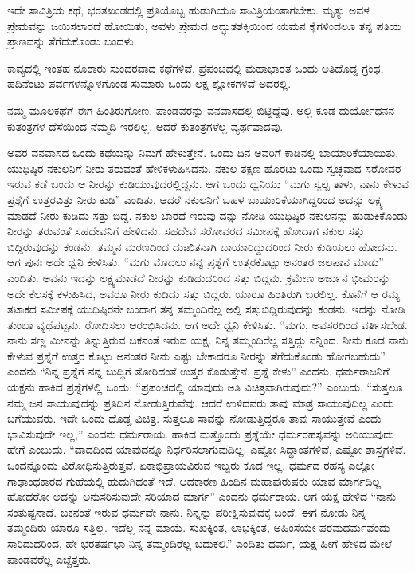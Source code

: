 ಇದೇ ಸಾವಿತ್ರಿಯ ಕಥೆ, ಭರತಖಂಡದಲ್ಲಿ ಪ್ರತಿಯೊಬ್ಬ ಹುಡುಗಿಯೂ ಸಾವಿತ್ರಿಯಂತಾಗಬೇಕು. ಮೃತ್ಯು ಅವಳ ಪ್ರೇಮವನ್ನು ಜಯಿಸಲಾರದೆ ಹೋಯಿತು, ಅವಳು ಪ್ರೇಮದ ಅದ್ಭುತಶಕ್ತಿಯಿಂದ ಯಮನ ಕೈಗಳಿಂದಲೂ ತನ್ನ ಪತಿಯ ಪ್ರಾಣವನ್ನು ತೆಗೆದುಕೊಂಡು ಬಂದಳು.

ಕಾವ್ಯದಲ್ಲಿ ಇಂತಹ ನೂರಾರು ಸುಂದರವಾದ ಕಥೆಗಳಿವೆ. ಪ್ರಪಂಚದಲ್ಲಿ ಮಹಾಭಾರತ ಒಂದು ಅತಿದೊಡ್ಡ ಗ್ರಂಥ, ಹದಿನೆಂಟು ಪರ್ವಗಳನ್ನೊಳಗೊಂಡ ಸುಮಾರು ಒಂದು ಲಕ್ಷ ಶ್ಲೋಕಗಳಿವೆ ಅದರಲ್ಲಿ.

ನಮ್ಮ ಮೂಲಕಥೆಗೆ ಈಗ ಹಿಂತಿರುಗೋಣ. ಪಾಂಡವರನ್ನು ವನವಾಸದಲ್ಲಿ ಬಿಟ್ಟಿದ್ದೆವು. ಅಲ್ಲಿ ಕೂಡ ದುರ್ಯೋಧನನ ಕುತಂತ್ರಗಳ ದೆಸೆಯಿಂದ ನೆಮ್ಮದಿ ಇರಲಿಲ್ಲ. ಆದರೆ ಕುತಂತ್ರಗಳೆಲ್ಲ ವ್ಯರ್ಥವಾದವು.

ಅವರ ವನವಾಸದ ಒಂದು ಕಥೆಯನ್ನು ನಿಮಗೆ ಹೇಳುತ್ತೇನೆ. ಒಂದು ದಿನ ಅವರಿಗೆ ಕಾಡಿನಲ್ಲಿ ಬಾಯಾರಿಕೆಯಾಯಿತು. ಯುಧಿಷ್ಠಿರ ನಕುಲನಿಗೆ ನೀರು ತರುವಂತೆ ಹೇಳಿಕಳುಹಿಸಿದನು. ನಕುಲ ತಕ್ಷಣ ಹೊರಟು ಒಂದು ಸ್ವಚ್ಛವಾದ ಸರೋವರ ಇರುವ ಕಡೆ ಬಂದು ಆ ನೀರನ್ನು ಕುಡಿಯುವುದರಲ್ಲಿದ್ದನು. ಆಗ ಒಂದು ಧ್ವನಿಯು “ಮಗು ಸ್ವಲ್ಪ ತಾಳು, ನಾನು ಕೇಳುವ ಪ್ರಶ್ನೆಗೆ ಉತ್ತರವಿತ್ತು ನೀರು ಕುಡಿ” ಎಂದಿತು. ಆದರೆ ನಕುಲನಿಗೆ ಬಹಳ ಬಾಯಾರಿಕೆಯಾಗಿದ್ದರಿಂದ ಅದನ್ನು ಲಕ್ಷ್ಯ ಮಾಡದೆ ನೀರು ಕುಡಿದು ಸತ್ತು ಬಿದ್ದ. ನಕುಲ ಬಾರದೆ ಇರುವು ದನ್ನು ನೋಡಿ ಯುಧಿಷ್ಠಿರ ನಕುಲನನ್ನು ಹುಡುಕಿಕೊಂಡು ನೀರನ್ನು ತರುವಂತೆ ಸಹದೇವನಿಗೆ ಹೇಳಿದನು. ಸಹದೇವ ಸರೋವರದ ಸಮೀಪಕ್ಕೆ ಹೋದಾಗ ನಕುಲ ಸತ್ತು ಬಿದ್ದಿರುವುದನ್ನು ಕಂಡನು. ತಮ್ಮನ ಮರಣದಿಂದ ದುಃಖಿತನಾಗಿ ಬಾಯಾರಿದ್ದುದರಿಂದ ನೀರು ಕುಡಿಯಲು ಹೋದನು. ಆಗ ಪುನಃ ಅದೇ ಧ್ವನಿ ಕೇಳಿಸಿತು. “ಮಗು ಮೊದಲು ನನ್ನ ಪ್ರಶ್ನೆಗೆ ಉತ್ತರಕೊಟ್ಟು ಅನಂತರ ಜಲಪಾನ ಮಾಡು” ಎಂದಿತು. ಅವನು ಇದನ್ನು ಲಕ್ಷ್ಯಮಾಡದೆ ನೀರನ್ನು ಕುಡಿದುದರಿಂದ ಸತ್ತು ಬಿದ್ದನು. ಕ್ರಮೇಣ ಅರ್ಜುನ ಭೀಮರನ್ನು ಅದೇ ಕೆಲಸಕ್ಕೆ ಕಳುಹಿಸಿದ, ಅವರೂ ನೀರು ಕುಡಿದು ಸತ್ತು ಬಿದ್ದರು. ಯಾರೂ ಹಿಂತಿರುಗಿ ಬರಲಿಲ್ಲ. ಕೊನೆಗೆ ಆ ರಮ್ಯ ತಟಾಕದ ಸಮೀಪಕ್ಕೆ ಯುಧಿಷ್ಠಿರನೇ ಬಂದಾಗ ತನ್ನ ತಮ್ಮಂದಿರೆಲ್ಲ ಅಲ್ಲಿ ಸತ್ತುಬಿದ್ದಿರುವುದನ್ನು ಕಂಡನು. ಇದನ್ನು ನೋಡಿ ತುಂಬಾ ವ್ಯಥೆಪಟ್ಟನು. ರೋದಿಸಲು ಆರಂಭಿಸಿದನು. ಆಗ ಅದೇ ಧ್ವನಿ ಕೇಳಿಸಿತು. “ಮಗು, ಅವಸರದಿಂದ ವರ್ತಿಸಬೇಡ. ನಾನು ಸಣ್ಣ ಮೀನನ್ನು ತಿನ್ನುತ್ತಿರುವ ಬಕನಂತೆ ಇರುವ ಯಕ್ಷ. ನಿನ್ನ ತಮ್ಮಂದಿರೆಲ್ಲ ಸತ್ತಿದ್ದು ನನ್ನಿಂದ. ನೀನು ಕೂಡ ನಾನು ಕೇಳುವ ಪ್ರಶ್ನೆಗೆ ಉತ್ತರ ಕೊಟ್ಟು ಅನಂತರ ನೀನು ಎಷ್ಟು ಬೇಕಾದರೂ ನೀರನ್ನು ತೆಗೆದುಕೊಂಡು ಹೋಗಬಹುದು” ಎಂದನು “ನಿನ್ನ ಪ್ರಶ್ನೆಗೆ ನನ್ನ ಬುದ್ಧಿಗೆ ತೋರಿದಂತೆ ಉತ್ತರ ಕೊಡುತ್ತೇನೆ. ಪ್ರಶ್ನೆ ಕೇಳು” ಎಂದನು. ಧರ್ಮರಾಜನಿಗೆ ಯಕ್ಷನು ಹಾಕಿದ ಪ್ರಶ್ನೆಗಳಲ್ಲಿ ಒಂದು: “ಪ್ರಪಂಚದಲ್ಲಿ ಯಾವುದು ಅತಿ ವಿಚಿತ್ರವಾಗಿರುವುದು?” ಎಂಬುದು. “ಸುತ್ತಲೂ ನಮ್ಮ ಜನ ಸಾಯುವುದನ್ನು ಪ್ರತಿದಿನ ನೋಡುತ್ತಿರುವೆವು. ಆದರೆ ಉಳಿದವರು ತಾವು ಮಾತ್ರ ಸಾಯುವುದಿಲ್ಲ ಎಂದು ಬಗೆಯುವರು. ಇದೇ ಒಂದು ದೊಡ್ಡ ವಿಚಿತ್ರ. ಸುತ್ತಲೂ ಸಾವನ್ನು ನೋಡುತ್ತಿದ್ದರೂ ತಾವು ಸಾಯುತ್ತೇವೆ ಎಂದು ಭಾವಿಸುವುದೇ ಇಲ್ಲ,” ಎಂದನು ಧರ್ಮರಾಯ. ಹಾಕಿದ ಮತ್ತೊಂದು ಪ್ರಶ್ನೆಯೇ ಧರ್ಮರಹಸ್ಯವನ್ನು ಅರಿಯುವುದು ಹೇಗೆ ಎಂಬುದು. “ವಾದದಿಂದ ಯಾವುದನ್ನೂ ನಿರ್ಧರಿಸಲಾಗುವುದಿಲ್ಲ. ಎಷ್ಟೋ ಸಿದ್ಧಾಂತಗಳಿವೆ, ಎಷ್ಟೋ ಶಾಸ್ತ್ರಗಳಿವೆ. ಒಂದನ್ನೊಂದು ವಿರೋಧಿಸುತ್ತಿರುತ್ತವೆ. ಏಕಾಭಿಪ್ರಾಯವಿರುವ ಇಬ್ಬರು ಕೂಡ ಇಲ್ಲ. ಧರ್ಮದ ರಹಸ್ಯ ಎಲ್ಲೋ ಗಾಢಾಂಧಕಾರದ ಗುಹೆಯಲ್ಲಿ ಹುದುಗಿದಂತೆ ಇದೆ. ಆದಕಾರಣ ಹಿಂದಿನ ಮಹಾಪುರುಷರು ಯಾವ ಮಾರ್ಗದಿಲ್ಲ ಹೋದರೋ ಅದನ್ನು ಅನುಸರಿಸುವುದೇ ಸರಿಯಾದ ಮಾರ್ಗ” ಎಂದನು ಧರ್ಮರಾಯ. ಆಗ ಯಕ್ಷ ಹೇಳಿದ “ನಾನು ಸಂತುಷ್ಟನಾದೆ. ಬಕನಂತೆ ಇರುವ ಧರ್ಮವೇ ನಾನು. ನಿನ್ನನ್ನು ಪರೀಕ್ಷಿಸುವುದಕ್ಕೆ ಬಂದೆ. ಈಗ ನೋಡು ನಿನ್ನ ತಮ್ಮಂದಿರು ಯಾರೂ ಸತ್ತಿಲ್ಲ. ಇದೆಲ್ಲ ನನ್ನ ಮಾಯೆ. ಸುಖಕ್ಕಿಂತ, ಲಾಭಕ್ಕಿಂತ, ಅಹಿಂಸೆಯೇ ಪರಮಧರ್ಮವೆಂದು ಸಾರಿದುದರಿಂದ, ಹೇ ಭರತರ್ಷಭಾ ನಿನ್ನ ತಮ್ಮಂದಿರೆಲ್ಲ ಬದುಕಲಿ.” ಎಂದಿತು ಧರ್ಮ, ಯಕ್ಷ ಹೀಗೆ ಹೇಳಿದ ಮೇಲೆ ಪಾಂಡವರೆಲ್ಲ ಎಚ್ಚೆತ್ತರು.

